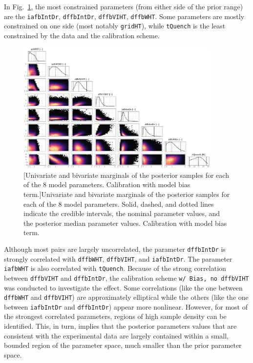 In Fig.~\ref{fig:ch5_plot_ens_all_disc_centered}, the most constrained parameters (from either side of the prior range) are the \texttt{iafbIntDr}, \texttt{dffbIntDr}, \texttt{dffbVIHT}, \texttt{dffbWHT}.
Some parameters are mostly constrained on one side (most notably \texttt{gridHT}), while \texttt{tQuench} is the least constrained by the data and the calibration scheme.

\begin{figure}
	\centering
	\includegraphics[width=0.90\textwidth]{../figures/chapter5/figures/plotEnsAllDiscCentered}
		[Univariate and bivariate marginals of the posterior samples for each of the $8$ model parameters. Calibration with model bias term.]{Univariate and bivariate marginals of the posterior samples for each of the $8$ model parameters. Solid, dashed, and dotted lines indicate the credible intervals, the nominal parameter values, and the posterior median parameter values. Calibration with model bias term.}
	\label{fig:ch5_plot_ens_all_disc_centered}
\end{figure}

Although most pairs are largely uncorrelated, the parameter \texttt{dffbIntDr} is strongly correlated with \texttt{dffbWHT}, \texttt{dffbVIHT}, and \texttt{iafbIntDr}.
The parameter \texttt{iafbWHT} is also correlated with \texttt{tQuench}.
Because of the strong correlation between \texttt{dffbVIHT} and \texttt{dffbIntDr}, the calibration scheme \texttt{w/ Bias, no dffbVIHT} was conducted to investigate the effect.
Some correlations (like the one between \texttt{dffbWHT} and \texttt{dffbVIHT}) are approximately elliptical while the others (like the one between \texttt{iafbIntDr} and \texttt{dffbIntDr}) appear more nonlinear.
However, for most of the strongest correlated parameters, regions of high sample density can be identified.
This, in turn, implies that the posterior parameters values that are consistent with the experimental data are largely contained within a small, bounded region of the parameter space, much smaller than the prior parameter space.

